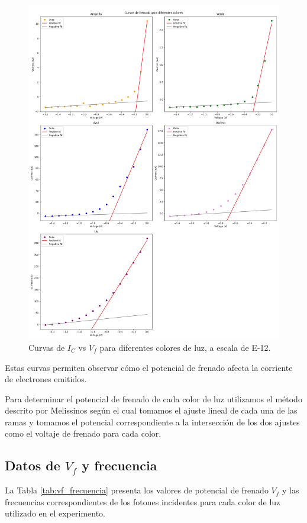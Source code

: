 \documentclass[twocolumn,a4paper,11pt]{scrartcl}
\begin{document}
\begin{figure}[h]
    \centering
    \includegraphics[width=0.8\linewidth]{planck_constant_fits.png}
    \caption{Curvas de $I_C$ vs $V_f$ para diferentes colores de luz, a escala de E-12.}
    \label{fig:ic_vs_vf}
\end{figure}

Estas curvas permiten observar cómo el potencial de frenado afecta la corriente de electrones emitidos.

Para determinar el potencial de frenado de cada color de luz utilizamos el método descrito por Melissinos \cite{melissinos1966} según el cual tomamos el ajuste lineal de cada una de las ramas y tomamos el potencial correspondiente a la intersección de los dos ajustes como el voltaje de frenado para cada color.

\subsection{Datos de $V_f$ y frecuencia}

La Tabla \ref{tab:vf_frecuencia} presenta los valores de potencial de frenado $V_f$ y las frecuencias correspondientes de los fotones incidentes para cada color de luz utilizado en el experimento.
\end{document}

